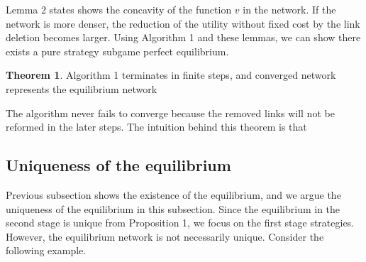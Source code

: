 \documentclass[12pt]{article}
\theoremstyle{definition}
\newtheorem{theorem}{Theorem}
\begin{document}
Lemma 2 states shows the concavity of the function $v$ in the network.
If the network is more denser, the reduction of the utility without fixed cost by the link deletion becomes larger.
Using Algorithm 1 and these lemmas, we can show there exists a pure strategy subgame perfect equilibrium.

\begin{theorem}
Algorithm 1 terminates in finite steps, and converged network represents the equilibrium network
\end{theorem}

The algorithm never fails to converge because the removed links will not be reformed in the later steps.
The intuition behind this theorem is that


\subsection{Uniqueness of the equilibrium}

Previous subsection shows the existence of the equilibrium, and we argue the uniqueness of the equilibrium in this subsection.
Since the equilibrium in the second stage is unique from Proposition 1, we focus on the first stage strategies.
However, the equilibrium network is not necessarily unique.
Consider the following example.
\end{document}
